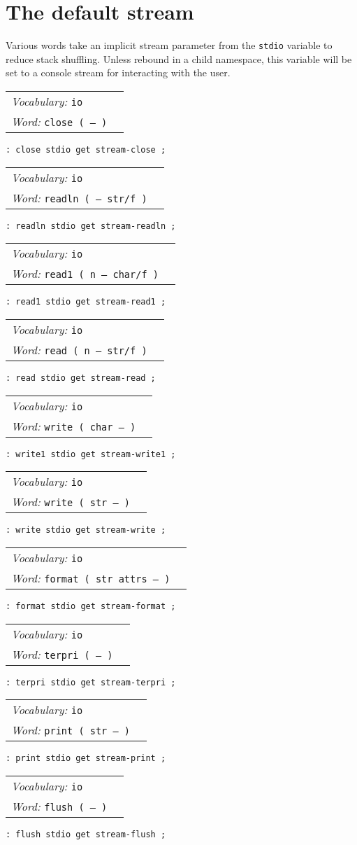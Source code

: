 \documentclass{book}
\newcommand{\vocabulary}[1]{\emph{Vocabulary:} \texttt{#1}&\\}
\newcommand{\ordinaryword}[2]{\index{\texttt{#1}}\emph{Word:} \texttt{#2}&\\}
\newcommand{\wordtable}[1]{


\begin{tabularx}{12cm}{lX}
\hline
#1
\hline
\end{tabularx}

}
\begin{document}
\section{The default stream}\label{stdio}
Various words take an implicit stream parameter from the \texttt{stdio} variable to reduce stack shuffling. Unless rebound in a child namespace, this variable will be set to a console stream for interacting with the user.
\wordtable{
\vocabulary{io}
\ordinaryword{close}{close ( -- )}

}
\begin{verbatim}
: close stdio get stream-close ;
\end{verbatim}
\wordtable{
\vocabulary{io}
\ordinaryword{readln}{readln ( -- str/f )}

}
\begin{verbatim}
: readln stdio get stream-readln ;
\end{verbatim}
\wordtable{
\vocabulary{io}
\ordinaryword{read1}{read1 ( n -- char/f )}

}
\begin{verbatim}
: read1 stdio get stream-read1 ;
\end{verbatim}
\wordtable{
\vocabulary{io}
\ordinaryword{read}{read ( n -- str/f )}

}
\begin{verbatim}
: read stdio get stream-read ;
\end{verbatim}
\wordtable{
\vocabulary{io}
\ordinaryword{write1}{write ( char -- )}

}
\begin{verbatim}
: write1 stdio get stream-write1 ;
\end{verbatim}
\wordtable{
\vocabulary{io}
\ordinaryword{write}{write ( str -- )}

}
\begin{verbatim}
: write stdio get stream-write ;
\end{verbatim}
\wordtable{
\vocabulary{io}
\ordinaryword{format}{format ( str attrs -- )}

}
\begin{verbatim}
: format stdio get stream-format ;
\end{verbatim}
\wordtable{
\vocabulary{io}
\ordinaryword{terpri}{terpri ( -- )}

}
\begin{verbatim}
: terpri stdio get stream-terpri ;
\end{verbatim}
\wordtable{
\vocabulary{io}
\ordinaryword{print}{print ( str -- )}

}
\begin{verbatim}
: print stdio get stream-print ;
\end{verbatim}
\wordtable{
\vocabulary{io}
\ordinaryword{flush}{flush ( -- )}

}
\begin{verbatim}
: flush stdio get stream-flush ;
\end{verbatim}
\end{document}
